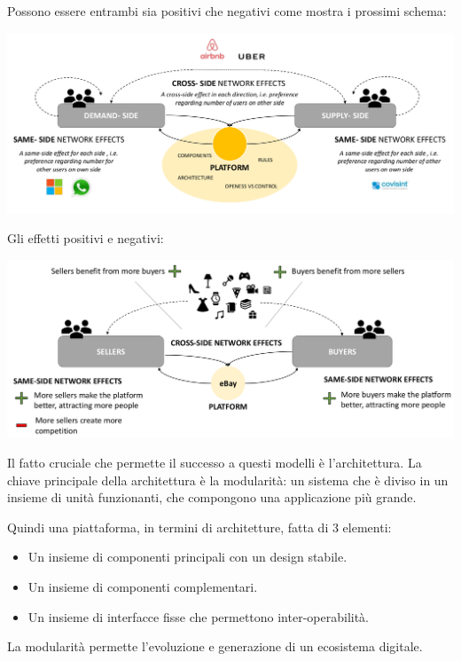 \documentclass[a4page, 11pt]{article}
\begin{document}
Possono essere entrambi sia positivi che negativi come mostra i prossimi
schema:
\begin{center}
	\includegraphics[scale=0.35]{image5.png}
\end{center}
Gli effetti positivi e negativi: \newline
\begin{center}
	\includegraphics[scale=0.35]{image6.png}
\end{center}



Il fatto cruciale che permette il successo a questi modelli è
l'architettura. La chiave principale della architettura è la modularità:
un sistema che è diviso in un insieme di unità funzionanti, che
compongono una applicazione più grande.

Quindi una piattaforma, in termini di architetture, fatta di 3 elementi:

\begin{itemize}
	 
	\item
	Un insieme di componenti principali con un design stabile.
	\item
	Un insieme di componenti complementari.
	\item
	Un insieme di interfacce fisse che permettono inter-operabilità.
\end{itemize}

La modularità permette l'evoluzione e generazione di un ecosistema
digitale.
\end{document}
